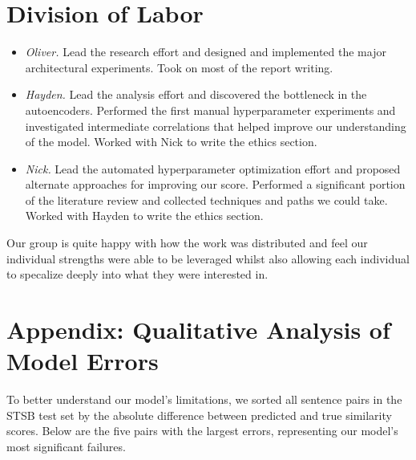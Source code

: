 \documentclass{article}
\begin{document}
\section{Division of Labor}
\begin{itemize}
    \item \textit{Oliver.}  Lead the research effort and designed and implemented the major architectural experiments. Took on most of the report writing.
    \item \textit{Hayden.} Lead the analysis effort and discovered the bottleneck in the autoencoders. Performed the first manual hyperparameter experiments and investigated intermediate correlations that helped improve our understanding of the model. Worked with Nick to write the ethics section.
    \item \textit{Nick.}  Lead the automated hyperparameter optimization effort and proposed alternate approaches for improving our score. Performed a significant portion of the literature review and collected techniques and paths we could take. Worked with Hayden to write the ethics section.
\end{itemize}
Our group is quite happy with how the work was distributed and feel our individual strengths were able to be leveraged whilst also allowing each individual to specalize deeply into what they were interested in.

\newpage
\section{Appendix: Qualitative Analysis of Model Errors} \label{error analysis}
To better understand our model's limitations, we sorted all sentence pairs in the STSB test set by the absolute difference between predicted and true similarity scores. Below are the five pairs with the largest errors, representing our model's most significant failures.
\end{document}
